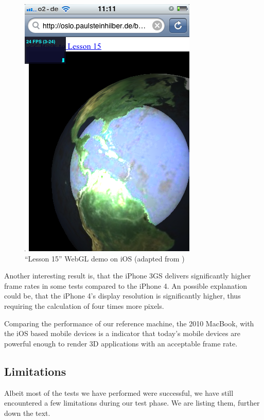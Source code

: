 \documentclass[12pt,journal,compsoc]{IEEEtran}
\begin{document}
\begin{figure}[htb]
	\begin{center}  
    \includegraphics[width=0.7\columnwidth]{grafiken/lesson15_iOS}
      \caption{“Lesson 15” WebGL demo on iOS (adapted from \cite{lesson15})}
      \label{fig:lesson15_iOS}
    \end{center}
\end{figure}

Another interesting result is, that the iPhone 3GS delivers significantly higher frame rates in some tests compared to the iPhone 4. An possible explanation could be, that the iPhone 4’s display resolution is significantly higher, thus requiring the calculation of four times more pixels. 

Comparing the performance of our reference machine, the 2010 MacBook, with the iOS based mobile devices is a indicator that today's mobile devices are powerful enough to render 3D applications with an acceptable frame rate.

\subsection{Limitations}
Albeit most of the tests we have performed were successful, we have still encountered a few limitations during our test phase. We are listing them, further down the text.
\end{document}
